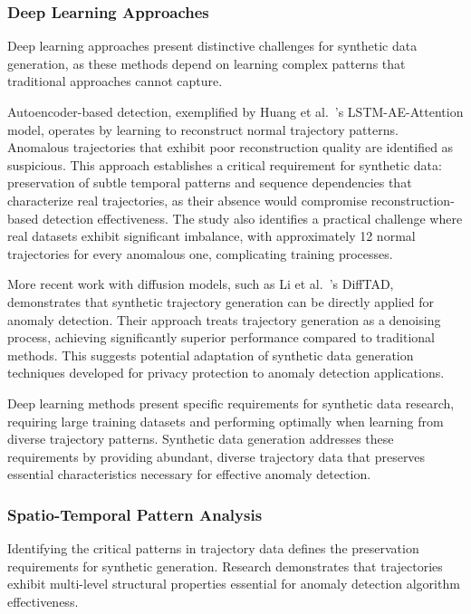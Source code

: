 \documentclass[runningheads]{llncs}
\begin{document}
\subsubsection{Deep Learning Approaches}
\label{sec:deep-learning}

Deep learning approaches present distinctive challenges for synthetic data generation, as these methods depend on learning complex patterns that traditional approaches cannot capture.

Autoencoder-based detection, exemplified by Huang et al.~\cite{huang2021lstm}'s LSTM-AE-Attention model, operates by learning to reconstruct normal trajectory patterns. Anomalous trajectories that exhibit poor reconstruction quality are identified as suspicious. This approach establishes a critical requirement for synthetic data: preservation of subtle temporal patterns and sequence dependencies that characterize real trajectories, as their absence would compromise reconstruction-based detection effectiveness. The study also identifies a practical challenge where real datasets exhibit significant imbalance, with approximately 12 normal trajectories for every anomalous one, complicating training processes.

More recent work with diffusion models, such as Li et al.~\cite{li2023diffusion}'s DiffTAD, demonstrates that synthetic trajectory generation can be directly applied for anomaly detection. Their approach treats trajectory generation as a denoising process, achieving significantly superior performance compared to traditional methods. This suggests potential adaptation of synthetic data generation techniques developed for privacy protection to anomaly detection applications.

Deep learning methods present specific requirements for synthetic data research, requiring large training datasets and performing optimally when learning from diverse trajectory patterns. Synthetic data generation addresses these requirements by providing abundant, diverse trajectory data that preserves essential characteristics necessary for effective anomaly detection.

\subsubsection{Spatio-Temporal Pattern Analysis}
\label{sec:spatio-temporal}

Identifying the critical patterns in trajectory data defines the preservation requirements for synthetic generation. Research demonstrates that trajectories exhibit multi-level structural properties essential for anomaly detection algorithm effectiveness.
\end{document}
